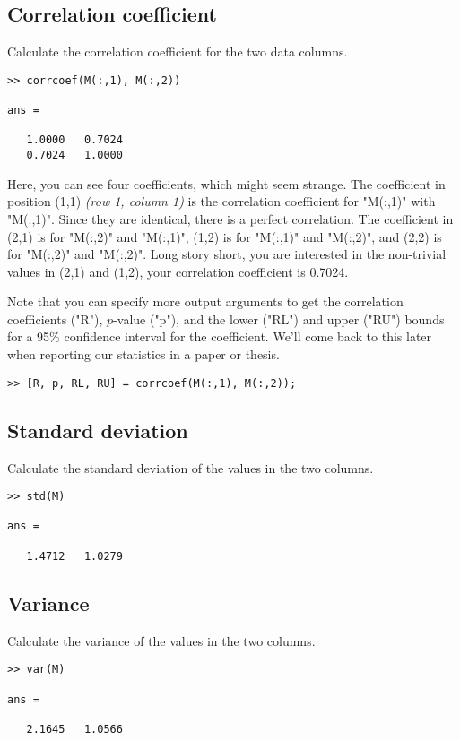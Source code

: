\documentclass[12pt,a4paper]{article}
\begin{document}
\subsection{Correlation coefficient}
Calculate the correlation coefficient for the two data columns.
\begin{lstlisting}[style=Matlab-editor]
>> corrcoef(M(:,1), M(:,2))

ans =
   
   1.0000   0.7024
   0.7024   1.0000
\end{lstlisting}

Here, you can see four coefficients, which might seem strange. 
The coefficient in position (1,1) \emph{(row 1, column 1)} is the correlation coefficient for "M(:,1)" with "M(:,1)". Since they are identical, there is a perfect correlation. The coefficient in (2,1) is for "M(:,2)" and "M(:,1)", (1,2) is for "M(:,1)" and "M(:,2)", and (2,2) is for "M(:,2)" and "M(:,2)".
Long story short, you are interested in the non-trivial values in (2,1) and (1,2), your correlation coefficient is 0.7024.

Note that you can specify more output arguments to get the correlation coefficients ("R"), $p$-value ("p"), and the lower ("RL") and upper ("RU") bounds for a 95\% confidence interval for the coefficient.
We'll come back to this later when reporting our statistics in a paper or thesis.
\begin{lstlisting}[style=Matlab-editor]
>> [R, p, RL, RU] = corrcoef(M(:,1), M(:,2));
\end{lstlisting}
\subsection{Standard deviation}
Calculate the standard deviation of the values in the two columns.
\begin{lstlisting}[style=Matlab-editor]
>> std(M)

ans =

   1.4712   1.0279
\end{lstlisting}

\subsection{Variance}
Calculate the variance of the values in the two columns.
\begin{lstlisting}[style=Matlab-editor]
>> var(M)

ans =

   2.1645   1.0566
\end{lstlisting}
\end{document}
